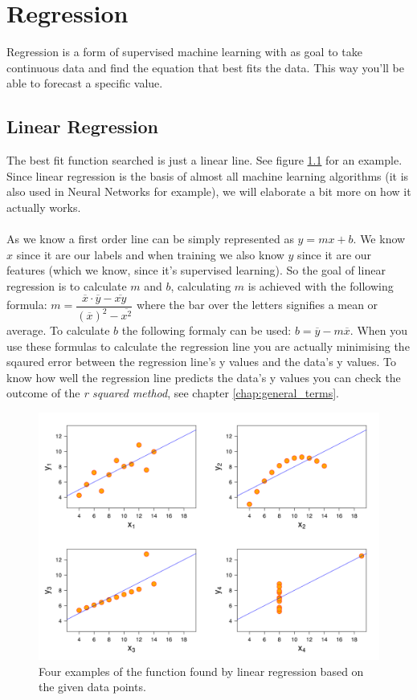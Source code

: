 \chapter{Regression}

Regression is a form of supervised machine learning with as goal to take continuous data and find the equation that best fits the data. This way you'll be able to forecast a specific value.

\section{Linear Regression}
The best fit function searched is just a linear line. See figure \ref{fig:linearregression} for an example. Since linear regression is the basis of almost all machine learning algorithms (it is also used in Neural Networks for example), we will elaborate a bit more on how it actually works. \\
\\
As we know a first order line can be simply represented as $y = mx + b$. We know $x$ since it are our labels and when training we also know $y$ since it are our features (which we know, since it's supervised learning). So the goal of linear regression is to calculate $m$ and $b$, calculating $m$ is achieved with the following formula: $m = \dfrac{\overline{x}\cdot\overline{y}-\overline{xy}}{(\overline{x})^2-\overline{x^2}}$ where the bar over the letters signifies a mean or average. To calculate $b$ the following formaly can be used: $b = \overline{y} - m\overline{x}$. When you use these formulas to calculate the regression line you are actually minimising the sqaured error between the regression line's y values and the data's y values. To know how well the regression line predicts the data's y values you can check the outcome of the \emph{r squared method}, see chapter \ref{chap:general_terms}.

\begin{figure}
\centering
\includegraphics[width=1\textwidth]{images/linear_regression.png}
\caption{\label{fig:linearregression}Four examples of the function found by linear regression based on the given data points.}
\end{figure}

